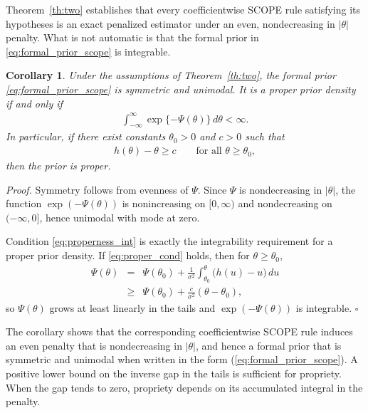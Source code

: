 \documentclass[11pt]{article}
\numberwithin{equation}{section}
\newtheorem{corollary}{Corollary}
\begin{document}
\medskip
\noindent
Theorem~\ref{th:two} establishes that every coefficientwise SCOPE rule satisfying its hypotheses is an exact penalized estimator under an even, nondecreasing in $|\theta|$ penalty. What is not automatic is that the formal prior in \eqref{eq:formal_prior_scope} is integrable.

\medskip
\noindent
\begin{corollary}
Under the assumptions of Theorem~\ref{th:two}, the formal prior \eqref{eq:formal_prior_scope} is symmetric and unimodal. It is a proper prior density if and only if
\begin{eqnarray}
\int_{-\infty}^{\infty} \exp\{-\Psi(\theta)\}\,d\theta < \infty .
\label{eq:properness_int}
\end{eqnarray}
In particular, if there exist constants $\theta_0>0$ and $c>0$ such that
\begin{eqnarray}
h(\theta)-\theta \ge c
\qquad \mbox{for all } \theta \ge \theta_0,
\label{eq:proper_cond}
\end{eqnarray}
then the prior is proper.
\end{corollary}

\medskip
\noindent
\emph{Proof.}
Symmetry follows from evenness of $\Psi$. Since $\Psi$ is nondecreasing in $|\theta|$, the function $\exp(-\Psi(\theta))$ is nonincreasing on $[0,\infty)$ and nondecreasing on $(-\infty,0]$, hence unimodal with mode at zero.

Condition \eqref{eq:properness_int} is exactly the integrability requirement for a proper prior density. If \eqref{eq:proper_cond} holds, then for $\theta \ge \theta_0$,
\begin{eqnarray}
\Psi(\theta)
&=&
\Psi(\theta_0)
+
\frac{1}{\sigma^2}\int_{\theta_0}^{\theta} \bigl(h(u)-u\bigr)\,du
\nonumber \\
&\ge&
\Psi(\theta_0) + \frac{c}{\sigma^2}(\theta-\theta_0),
\end{eqnarray}
so $\Psi(\theta)$ grows at least linearly in the tails and $\exp(-\Psi(\theta))$ is integrable.
\hfill $\square$

\medskip
\noindent
The corollary shows that the corresponding coefficientwise SCOPE rule induces an even penalty that is nondecreasing in $|\theta|$,
and hence a formal prior that is symmetric and unimodal when written in
the form (\ref{eq:formal_prior_scope}). A positive lower bound on the inverse gap in the tails is sufficient for propriety. When the gap tends to zero, propriety depends on its accumulated integral in the penalty.
\end{document}
